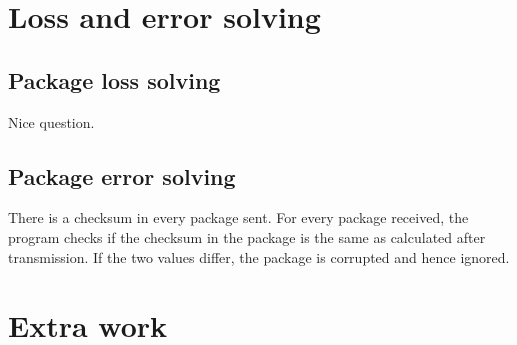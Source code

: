 \documentclass[10pt,a4paper]{article}
\begin{document}
\section{Loss and error solving}
    \subsection{Package loss solving}
        Nice question.
    \subsection{Package error solving}
        There is a checksum in every package sent. For every package received, the program checks if the checksum in the package is the same as calculated after transmission. If the two values differ, the package is corrupted and hence ignored.
	
\section{Extra work}
\end{document}
